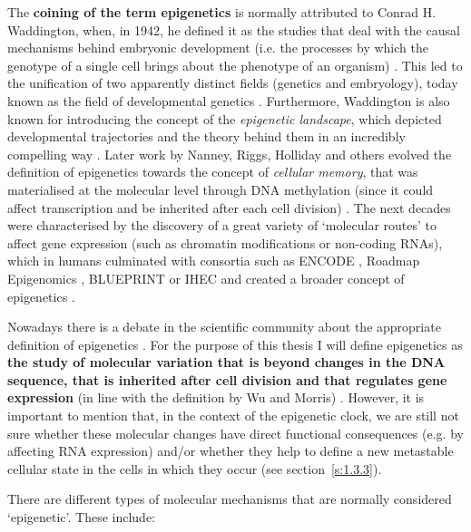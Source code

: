 \smallskip

The \textbf{coining of the term epigenetics} is normally attributed to Conrad H. Waddington, when, in 1942, he defined it as the studies that deal with the causal mechanisms behind embryonic development (i.e. the processes by which the genotype of a single cell brings about the phenotype of an organism) \citep{Waddington1942}. This led to the unification of two apparently distinct fields (genetics and embryology), today known as the field of developmental genetics \citep{Gilbert2011}. Furthermore, Waddington is also known for introducing the concept of the \textit{epigenetic landscape}, which depicted developmental trajectories and the theory behind them in an incredibly compelling way \citep{Waddington1957}. Later work by Nanney, Riggs, Holliday and others evolved the definition of epigenetics towards the concept of \textit{cellular memory}, that was materialised at the molecular level through DNA methylation (since it could affect transcription and be inherited after each cell division) \citep{Lappalainen2017}. The next decades were characterised by the discovery of a great variety of `molecular routes' to affect gene expression (such as chromatin modifications or non-coding RNAs), which in humans culminated with consortia such as ENCODE \citep{Consortium2012}, Roadmap Epigenomics \citep{Consortium2015}, BLUEPRINT or \acrshort{IHEC} \citep{Stunnenberg2016} and created a broader concept of epigenetics \citep{Lappalainen2017,Greally2018}.

\bigskip

Nowadays there is a debate in the scientific community about the appropriate definition of epigenetics \citep{Greally2018,Bird2007}. For the purpose of this thesis I will define epigenetics as \textbf{the study of molecular variation that is beyond changes in the DNA sequence, that is inherited after cell division and that regulates gene expression} (in line with the definition by Wu and Morris) \citep{Wu2001}. However, it is important to mention that, in the context of the epigenetic clock, we are still not sure whether these molecular changes have direct functional consequences (e.g. by affecting RNA expression) and/or whether they help to define a new metastable cellular state in the cells in which they occur (see section~\ref{s:1.3.3}).

\bigskip

There are different types of molecular mechanisms that are normally considered `epigenetic'. These include:

